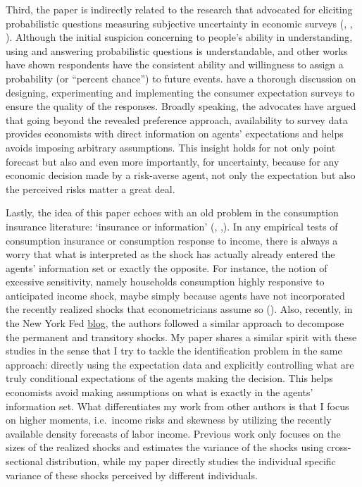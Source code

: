\documentclass[12pt,notitlepage,onecolumn,aps,pra]{article}
\begin{document}
Third, the paper is indirectly related to the research that advocated
for eliciting probabilistic questions measuring subjective uncertainty
in economic surveys (\cite{manski_measuring_2004},
\cite{delavande2011measuring}, \cite{manski_survey_2018}). Although the
initial suspicion concerning to people's ability in understanding, using
and answering probabilistic questions is understandable,
\cite{bertrand_people_2001} and other works have shown respondents have
the consistent ability and willingness to assign a probability (or
``percent chance'') to future events. \cite{armantier_overview_2017}
have a thorough discussion on designing, experimenting and implementing
the consumer expectation surveys to ensure the quality of the responses.
Broadly speaking, the advocates have argued that going beyond the
revealed preference approach, availability to survey data provides
economists with direct information on agents' expectations and helps
avoids imposing arbitrary assumptions. This insight holds for not only
point forecast but also and even more importantly, for uncertainty,
because for any economic decision made by a risk-averse agent, not only
the expectation but also the perceived risks matter a great deal.

Lastly, the idea of this paper echoes with an old problem in the
consumption insurance literature: `insurance or information'
(\cite{pistaferri_superior_2001},
\cite{kaufmann_disentangling_2009},\cite{meghir2011earnings}). In any
empirical tests of consumption insurance or consumption response to
income, there is always a worry that what is interpreted as the shock
has actually already entered the agents' information set or exactly the
opposite. For instance, the notion of excessive sensitivity, namely
households consumption highly responsive to anticipated income shock,
maybe simply because agents have not incorporated the recently realized
shocks that econometricians assume so (\cite{flavin_excess_1988}). Also,
recently, in the New York Fed
\href{https://libertystreeteconomics.newyorkfed.org/2017/11/understanding-permanent-and-temporary-income-shocks.html}{blog},
the authors followed a similar approach to decompose the permanent and
transitory shocks. My paper shares a similar spirit with these studies
in the sense that I try to tackle the identification problem in the same
approach: directly using the expectation data and explicitly controlling
what are truly conditional expectations of the agents making the
decision. This helps economists avoid making assumptions on what is
exactly in the agents' information set. What differentiates my work from
other authors is that I focus on higher moments, i.e.~income risks and
skewness by utilizing the recently available density forecasts of labor
income. Previous work only focuses on the sizes of the realized shocks
and estimates the variance of the shocks using cross-sectional
distribution, while my paper directly studies the individual specific
variance of these shocks perceived by different individuals.
\end{document}
